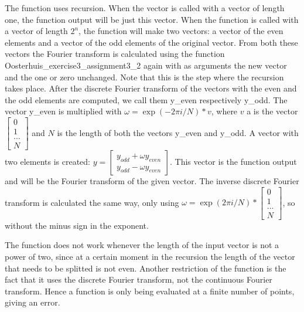 \documentclass[12pt]{article}
\newcommand{\N}{\mathbb{N}}
\begin{document}
The function uses recursion. When the vector is called with a vector of length one, the function output will be just this vector. When the function is called with a vector of length $2^n$, the function will make two vectors: a vector of the even elements and a vector of the odd elements of the original vector. From both these vectors the Fourier transform is calculated using the function Oosterhuis\_exercise3\_assignment3\_2 again with as arguments the new vector and the one or zero unchanged. Note that this is the step where the recursion takes place. After the discrete Fourier transform of the vectors with the even and the odd elements are computed, we call them y\_even respectively y\_odd. The vector y\_even is multiplied with $\omega = \exp(-2 \pi i / N) * v $, where $v$ a is the vector $\begin{bmatrix} 0 \\ 1 \\ \dots \\ N \end{bmatrix} $ and $N$ is the length of both the vectors y\_even and y\_odd. A vector with two elements is created: $y = \begin{bmatrix} y_{odd} + \omega y_{even} \\ y_{odd} - \omega y_{even} \end{bmatrix}$. This vector is the function output and will be the Fourier transform of the given vector.
The inverse discrete Fourier transform is calculated the same way, only using $\omega = \exp{(2\pi i / N)} * \begin{bmatrix} 0 \\ 1 \\ \dots \\N \end{bmatrix}$, so without the minus sign in the exponent. %

%
The function does not work whenever the length of the input vector is not a power of two, since at a certain moment in the recursion the length of the vector that needs to be splitted is not even. Another restriction of the function is the fact that it uses the discrete Fourier transform, not the continuous Fourier transform. Hence a function is only being evaluated at a finite number of points, giving an error. %
\end{document}
